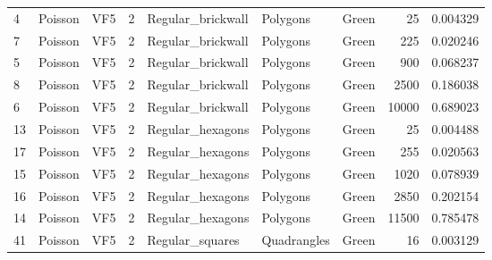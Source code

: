 \begin{tabular}{lllrlllrr}
4  &      Poisson &                               VF5 &               2 &               Regular\_brickwall &              Polygons  &      Green &                       25 &                         0.004329 \\
7  &      Poisson &                               VF5 &               2 &               Regular\_brickwall &              Polygons  &      Green &                      225 &                         0.020246 \\
5  &      Poisson &                               VF5 &               2 &               Regular\_brickwall &              Polygons  &      Green &                      900 &                         0.068237 \\
8  &      Poisson &                               VF5 &               2 &               Regular\_brickwall &              Polygons  &      Green &                     2500 &                         0.186038 \\
6  &      Poisson &                               VF5 &               2 &               Regular\_brickwall &              Polygons  &      Green &                    10000 &                         0.689023 \\
13 &      Poisson &                               VF5 &               2 &                Regular\_hexagons &              Polygons  &      Green &                       25 &                         0.004488 \\
17 &      Poisson &                               VF5 &               2 &                Regular\_hexagons &              Polygons  &      Green &                      255 &                         0.020563 \\
15 &      Poisson &                               VF5 &               2 &                Regular\_hexagons &              Polygons  &      Green &                     1020 &                         0.078939 \\
16 &      Poisson &                               VF5 &               2 &                Regular\_hexagons &              Polygons  &      Green &                     2850 &                         0.202154 \\
14 &      Poisson &                               VF5 &               2 &                Regular\_hexagons &              Polygons  &      Green &                    11500 &                         0.785478 \\
41 &      Poisson &                               VF5 &               2 &                 Regular\_squares &           Quadrangles  &      Green &                       16 &                         0.003129 \\

\end{tabular}

